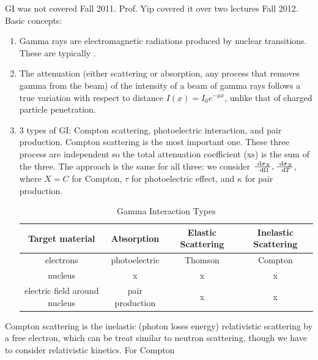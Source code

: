 \documentclass{school-22.101-notes}
\date{December 13, 2011}
\begin{document}
\maketitle

\clearpage
{}
GI was not covered Fall 2011. Prof. Yip covered it over two lectures Fall 2012. Basic concepts: 
\begin{enumerate}
\item Gamma rays are electromagnetic radiations produced by nuclear transitions. These are typically . 

\item The attenuation (either scattering or absorption, any process that removes gamma from the beam) of the intensity of a beam of gamma rays follows a true  variation with respect to distance $I(x) = I_0 e^{-\mu x}$, unlike that of charged particle penetration. 

\item 3 types of GI: Compton scattering, photoelectric interaction, and pair production. Compton scattering is the most important one. These three process are independent so the total attenuation coefficient (xs) is the sum of the three. The approach is the same for all three: we consider $\frac{\mbox{ }\mathrm{d} \sigma_X}{\mbox{ }\mathrm{d} \Omega}, \frac{\mbox{ }\mathrm{d} \sigma_X}{\mbox{ }\mathrm{d} T}$, where $X = C$ for Compton, $\tau$ for photoelectric effect, and $\kappa$ for pair production. 
  \begin{table}[ht]
    \centering
    \begin{tabular}{cccc} \hline
      Target material& Absorption & Elastic Scattering & Inelastic Scattering \\  \hline \hline
      electrons & photoelectric & Thomson & Compton \\  \hline
      nucleus & x & x & x \\ \hline
      electric field around nucleus & pair production & x & x \\ \hline
    \end{tabular}
    \caption{Gamma Interaction Types}
  \end{table}

\end{enumerate}

Compton scattering is the inelastic (photon loses energy) relativistic scattering by a free electron,  
which can be treat similar to neutron scattering, though we have to consider relativistic kinetics. For Compton
\end{document}
